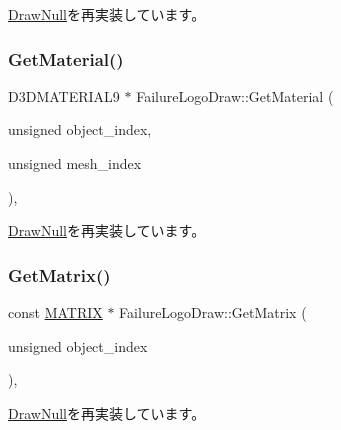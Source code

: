\mbox{\hyperlink{class_draw_null_a8496ed1b1f765a331a8f1704122b8ca4}{Draw\+Null}}を再実装しています。

\mbox{\label{class_failure_logo_draw_aaac019fb396a354ef0f823ed2bd72322}} 
\subsubsection{\texorpdfstring{Get\+Material()}{GetMaterial()}}
{\footnotesize\ttfamily D3\+D\+M\+A\+T\+E\+R\+I\+A\+L9 $\ast$ Failure\+Logo\+Draw\+::\+Get\+Material (\begin{DoxyParamCaption}\item[{unsigned}]{object\+\_\+index,  }\item[{unsigned}]{mesh\+\_\+index }\end{DoxyParamCaption})\hspace{0.3cm}{\ttfamily [override]}, {\ttfamily [virtual]}}



\mbox{\hyperlink{class_draw_null_a84969d22d3436986f214e9896fe44fc6}{Draw\+Null}}を再実装しています。

\mbox{\label{class_failure_logo_draw_aefc4be9e6ead4d90a5fc9c22cc07fe92}} 
\subsubsection{\texorpdfstring{Get\+Matrix()}{GetMatrix()}}
{\footnotesize\ttfamily const \mbox{\hyperlink{_vector3_d_8h_a032295cd9fb1b711757c90667278e744}{M\+A\+T\+R\+IX}} $\ast$ Failure\+Logo\+Draw\+::\+Get\+Matrix (\begin{DoxyParamCaption}\item[{unsigned}]{object\+\_\+index }\end{DoxyParamCaption})\hspace{0.3cm}{\ttfamily [override]}, {\ttfamily [virtual]}}



\mbox{\hyperlink{class_draw_null_adede079e9c11a756090740b20bb43022}{Draw\+Null}}を再実装しています。

\mbox{\label{class_failure_logo_draw_aa7164b6f5788416788482893aa747d59}} 
